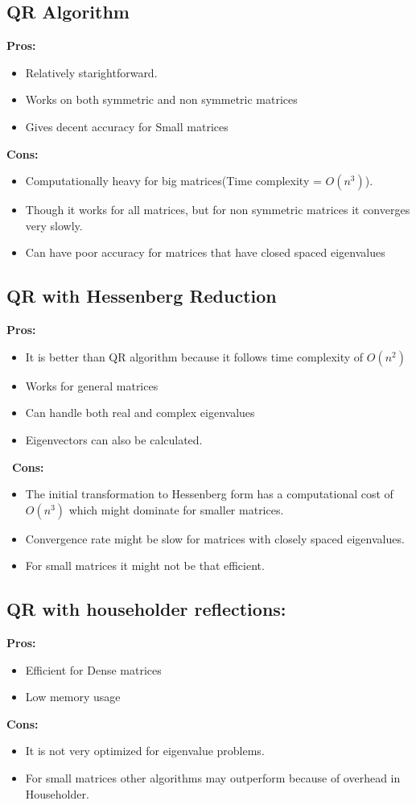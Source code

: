 \documentclass[12pt,oneside,letterpaper,english]{article}
\begin{document}
\subsection{QR Algorithm}
\textbf{Pros:}
\begin{itemize}
    \item Relatively starightforward.
    \item Works on both symmetric and non symmetric matrices
    \item Gives decent accuracy for Small matrices
\end{itemize}

\textbf{Cons:}
\begin{itemize}
    \item Computationally heavy for big matrices(Time complexity = $O(n^3)$).
    \item Though it works for all matrices, but for non symmetric matrices it converges very slowly.
    \item Can have poor accuracy for matrices that have closed spaced eigenvalues
\end{itemize}

\subsection{QR with Hessenberg Reduction}
\textbf{Pros:}
\begin{itemize}
    \item It is better than QR algorithm because it follows time complexity of $O(n^2)$
    \item Works for general matrices
    \item Can handle both real and complex eigenvalues
    \item Eigenvectors can also be calculated.
\end{itemize}\
\textbf{Cons:}
\begin{itemize}
    \item The initial transformation to Hessenberg form has a computational cost of $O(n^3)$ which might dominate for smaller matrices.
    \item Convergence rate might be slow for matrices with closely spaced eigenvalues.
    \item For small matrices it might not be that efficient.
\end{itemize}

\subsection{QR with householder reflections:}
\textbf{Pros:}
\begin{itemize}
    \item Efficient for Dense matrices
    \item Low memory usage
\end{itemize}
\textbf{Cons: }
\begin{itemize}
    \item It is not very optimized for eigenvalue problems.
    \item For small matrices other algorithms may outperform because of overhead in Householder.
\end{itemize}
\end{document}
